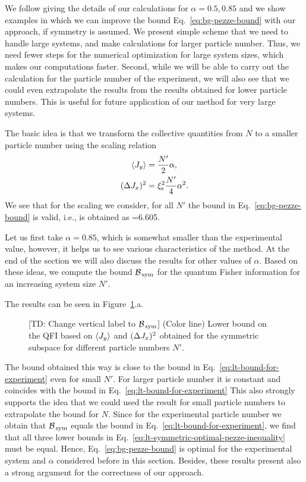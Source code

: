 We follow giving the details of our calculations for $\alpha=0.5,0.85$ and we show examples in which we can improve the bound Eq.~\eqref{eq:bg-pezze-bound} with our approach, if symmetry is assumed.
We present simple scheme that we need to handle large systems, and make calculations for larger particle number.
Thus, we need fewer steps for the numerical optimization for large system sizes, which makes our computations faster.
Second, while we will be able to carry out the calculation for the particle number of the experiment, we will also see that we could even extrapolate the results from the results obtained for lower particle numbers.
This is useful for future application of our method for very large systems.

The basic idea is that we transform the collective quantities from $N$ to a smaller particle number using the scaling relation
\begin{align}
  \langle{J_y}\rangle & = \frac{N'}{2}\alpha,\\
  (\Delta J_x )^2 & = \xi_{\textnormal{s}}^2 \frac{N'}{4}\alpha^2.
\end{align}
We see that for the scaling we consider, for all $N'$ the bound in Eq.~\eqref{eq:bg-pezze-bound} is valid, i.e., is obtained as
\be
  \geqslant {}=6.605.
\ee

Let us first take $\alpha=0.85$, which is somewhat smaller than the experimental value, however, it helps us to see various characteristics of the method.
At the end of the section we will also discuss the results for other values of $\alpha$.
Based on these ideas, we compute the bound $\mathcal{B}_{\, \textnormal{sym} }$ for the quantum Fisher information for an increasing system size $N'$.

The results can be seen in Figure~\ref{fig:lt-bounds-on-symmetric-spin-squeezing}.a.
\begin{figure}[htp]
  \centering
  \caption[Asymptotic behavior of the bound for increasing particle number for spin-squeezing experimental data]{[TD: Change vertical label to $\mathcal{B}_{\, \textnormal{sym} }$] (Color line) Lower bound on the QFI based on $\langle{J_y}\rangle$ and $(\Delta J_x )^2$ obtained for the symmetric subspace for different particle numbers $N'$.}
  \label{fig:lt-bounds-on-symmetric-spin-squeezing}
\end{figure}
The bound obtained this way is close to the bound in Eq.~\eqref{eq:lt-bound-for-experiment} even for small $N'$.
For larger particle number it is constant and coincides with the bound in Eq.~\eqref{eq:lt-bound-for-experiment}
This also strongly supports the idea that we could used the result for small particle numbers to extrapolate the bound for $N$.
Since for the experimental particle number we obtain that $\mathcal{B}_{\, \text{sym} }$ equals the bound in Eq.~\eqref{eq:lt-bound-for-experiment}, we find that all three lower bounds in Eq.~\eqref{eq:lt-symmetric-optimal-pezze-inequality} must be equal.
Hence, Eq.~\eqref{eq:bg-pezze-bound} is optimal for the experimental system and $\alpha$ considered before in this section.
Besides, these results present also a strong argument for the correctness of our approach.

